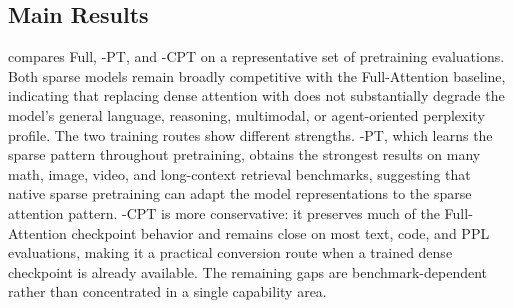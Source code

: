 \subsection{Main Results}
\label{sec:experiment-main-results}

 compares Full, \method{}-PT, and \method{}-CPT on a representative set of pretraining evaluations. Both sparse models remain broadly competitive with the Full-Attention baseline, indicating that replacing dense attention with \method{} does not substantially degrade the model's general language, reasoning, multimodal, or agent-oriented perplexity profile. The two training routes show different strengths. \method{}-PT, which learns the sparse pattern throughout pretraining, obtains the strongest results on many math, image, video, and long-context retrieval benchmarks, suggesting that native sparse pretraining can adapt the model representations to the sparse attention pattern. \method{}-CPT is more conservative: it preserves much of the Full-Attention checkpoint behavior and remains close on most text, code, and PPL evaluations, making it a practical conversion route when a trained dense checkpoint is already available. The remaining gaps are benchmark-dependent rather than concentrated in a single capability area.


